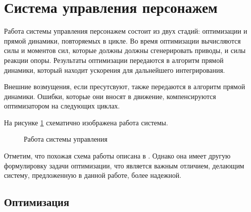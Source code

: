 \section{Система управления персонажем}

Работа системы управления персонажем состоит из двух стадий: оптимизации и прямой динамики, повторяемых в цикле. Во время оптимизации вычисляются силы и моментов сил, которые должны должны сгенерировать приводы, и силы реакции опоры. Результаты оптимизации передаются в алгоритм прямой динамики, который находит ускорения для дальнейшего интегрирования.

Внешние возмущения, если пресутсвуют, также передаются в алгоритм прямой динамики. Ошибки, которые они вносят в движение, компенсируются оптимизатором на следующих циклах.

На рисунке \ref{fig:architecture} схематично изображена работа системы.

\begin{figure}[h]
  \begin{minipage}{\textwidth}
    \centering
    \caption{Работа системы управления}
    \label{fig:architecture}
  \end{minipage}
\end{figure}

Отметим, что похожая схема работы описана в \cite{AbeSP}. Однако она имеет другую формулировку задачи оптимизации, что является важным отличием, делающим систему, предложенную в данной работе, более надежной.


\subsection{Оптимизация}

